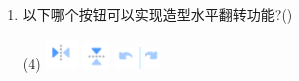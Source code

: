\documentclass[10pt, a4paper]{article}
\begin{document}
\begin{enumerate}
        \item 以下哪个按钮可以实现造型水平翻转功能?(\qquad)
        \begin{tasks}(4)
            \task \includegraphics[width=.03\textwidth]{8a.png}
            \task \includegraphics[width=.03\textwidth]{8b.png}
            \task \includegraphics[width=.03\textwidth]{8c.png}
            \task \includegraphics[width=.02\textwidth]{8d.png}
        \end{tasks}


\end{enumerate}
\end{document}
